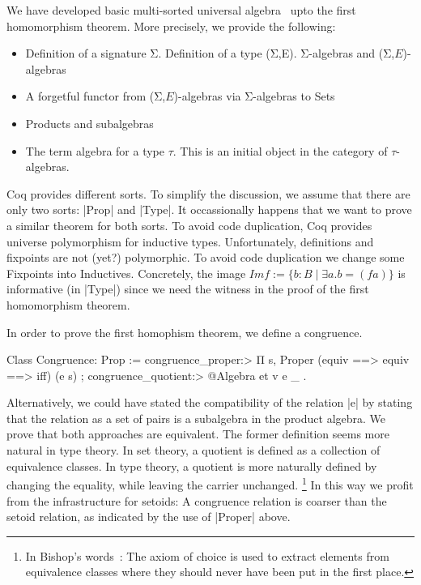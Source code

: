 \documentclass[a4paper,10pt,runningheads]{llncs}
\begin{document}

We have developed basic multi-sorted universal algebra~\cite{meinke1993universal} upto the first
homomorphism theorem. More precisely, we provide the following:
\begin{itemize}
 \item Definition of a signature Σ. Definition of a type (Σ,E). Σ-algebras and
(Σ,$E$)-algebras
 \item A forgetful functor from (Σ,$E$)-algebras via Σ-algebras to Sets
 \item Products and subalgebras
 \item The term algebra for a type $\tau$. This is an initial object in the category of
$\tau$-algebras.
\end{itemize}

Coq provides different sorts. To simplify the discussion, we assume that there are only two sorts:
|Prop| and |Type|. It occassionally happens that we want to prove a similar theorem for both sorts.
To avoid code duplication, Coq provides universe polymorphism for inductive types.
Unfortunately,
definitions and fixpoints are not (yet?) polymorphic. To avoid code duplication we
change some Fixpoints into
Inductives. Concretely, the image $Im f:=\{b:B \mid \exists a. b=(f
a)\}$ is informative (in |Type|) since we need the witness in the proof of the first homomorphism
theorem.

In order to prove the first homophism theorem, we define a congruence.
\begin{code}
Class Congruence: Prop :=
    { congruence_proper:> Π s, Proper (equiv ==> equiv ==> iff) (e s)
    ; congruence_quotient:> @Algebra et v e _
    }.
\end{code}
Alternatively, we could have stated the compatibility of the relation |e| by stating that the
relation as a set of pairs is a subalgebra in the product algebra. We prove that both approaches
are equivalent. The former definition seems more natural in type theory. In set theory, a quotient
is defined as a collection of equivalence classes. In type theory, a quotient is more naturally
defined by changing the equality, while leaving the carrier unchanged.%
\footnote{In Bishop's words~\cite[p.12]{Bishop/Bridges:1985}: The axiom of choice is used to extract
elements from equivalence classes where they should never have been put in the first place.}
 In this way we profit from
the infrastructure for setoids: A congruence relation is coarser than the setoid relation, as
indicated by the use of |Proper| above.
\end{document}

